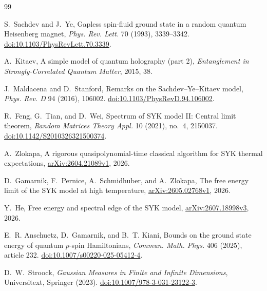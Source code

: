 \documentclass[11pt]{article}
\theoremstyle{remark}
\begin{document}
\begin{thebibliography}{99}

S.~Sachdev and J.~Ye,
\newblock Gapless spin-fluid ground state in a random quantum Heisenberg
magnet,
\newblock \emph{Phys. Rev. Lett.} 70 (1993), 3339--3342.
\newblock \href{https://doi.org/10.1103/PhysRevLett.70.3339}
{doi:10.1103/PhysRevLett.70.3339}.

A.~Kitaev,
\newblock A simple model of quantum holography (part 2),
\newblock \emph{Entanglement in Strongly-Correlated Quantum Matter}, 2015,
38.

J.~Maldacena and D.~Stanford,
\newblock Remarks on the Sachdev--Ye--Kitaev model,
\newblock \emph{Phys. Rev. D} 94 (2016), 106002.
\newblock \href{https://doi.org/10.1103/PhysRevD.94.106002}
{doi:10.1103/PhysRevD.94.106002}.

R.~Feng, G.~Tian, and D.~Wei,
\newblock Spectrum of SYK model II: Central limit theorem,
\newblock \emph{Random Matrices Theory Appl.} 10 (2021), no.~4, 2150037.
\newblock \href{https://doi.org/10.1142/S2010326321500374}
{doi:10.1142/S2010326321500374}.

A.~Zlokapa,
\newblock A rigorous quasipolynomial-time classical algorithm for SYK thermal
expectations,
\newblock \href{https://arxiv.org/abs/2604.21089}
{arXiv:2604.21089v1}, 2026.

D.~Gamarnik, F.~Pernice, A.~Schmidhuber, and A.~Zlokapa,
\newblock The free energy limit of the SYK model at high temperature,
\newblock \href{https://arxiv.org/abs/2605.02768}
{arXiv:2605.02768v1}, 2026.

Y.~He,
\newblock Free energy and spectral edge of the SYK model,
\newblock \href{https://arxiv.org/abs/2607.18998}
{arXiv:2607.18998v3}, 2026.

E.~R. Anschuetz, D.~Gamarnik, and B.~T. Kiani,
\newblock Bounds on the ground state energy of quantum $p$-spin Hamiltonians,
\newblock \emph{Commun. Math. Phys.} 406 (2025), article 232.
\newblock \href{https://doi.org/10.1007/s00220-025-05412-4}
{doi:10.1007/s00220-025-05412-4}.

D.~W.~Stroock,
\newblock \emph{Gaussian Measures in Finite and Infinite Dimensions},
\newblock Universitext, Springer (2023).
\newblock \href{https://doi.org/10.1007/978-3-031-23122-3}
{doi:10.1007/978-3-031-23122-3}.

\end{thebibliography}
\end{document}
